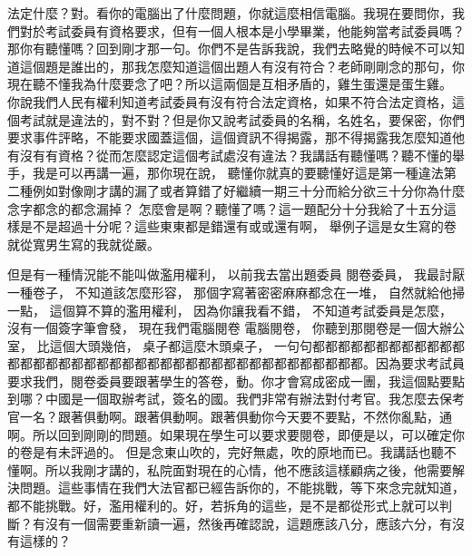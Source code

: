 \hypertarget{c08:cue:161}{}法定什麼？對。看你的電腦出了什麼問題，你就這麼相信電腦。我現在要問你，我們對於考試委員有資格要求，但有一個人根本是小學畢業，他能夠當考試委員嗎？
\hypertarget{c08:cue:162}{}那你有聽懂嗎？回到剛才那一句。你們不是告訴我說，我們去略覺的時候不可以知道這個題是誰出的，那我怎麼知道這個出題人有沒有符合？老師剛剛念的那句，你現在聽不懂我為什麼要念了吧？所以這兩個是互相矛盾的，雞生蛋還是蛋生雞。
\hypertarget{c08:cue:163}{}你說我們人民有權利知道考試委員有沒有符合法定資格，如果不符合法定資格，這個考試就是違法的，對不對？但是你又說考試委員的名稱，名姓名，要保密，你們要求事件評略，不能要求國蓋這個，這個資訊不得揭露，那不得揭露我怎麼知道他有沒有有資格？從而怎麼認定這個考試處沒有違法？我講話有聽懂嗎？聽不懂的舉手，我是可以再講一遍，那你現在說，
\hypertarget{c08:cue:164}{}聽懂你就真的要聽懂好這是第一種違法第二種例如對像剛才講的漏了或者算錯了好繼續一期三十分而給分欲三十分你為什麼念字都念的都念漏掉？
\hypertarget{c08:cue:165}{}怎麼會是啊？聽懂了嗎？這一題配分十分我給了十五分這樣是不是超過十分呢？這些東東都是錯還有或或還有啊，
\hypertarget{c08:cue:166}{}舉例子這是女生寫的卷就從寬男生寫的我就從嚴。

\hypertarget{c08:cue:167}{}但是有一種情況能不能叫做濫用權利，
\hypertarget{c08:cue:168}{}以前我去當出題委員 閱卷委員，
\hypertarget{c08:cue:169}{}我最討厭一種卷子，
\hypertarget{c08:cue:170}{}不知道該怎麼形容，
\hypertarget{c08:cue:171}{}那個字寫著密密麻麻都念在一堆，
\hypertarget{c08:cue:172}{}自然就給他掃一點，
\hypertarget{c08:cue:173}{}這個算不算的濫用權利，
\hypertarget{c08:cue:174}{}因為你讓我看不錯，
\hypertarget{c08:cue:175}{}不知道考試委員是怎麼，
\hypertarget{c08:cue:176}{}沒有一個簽字筆會發，
\hypertarget{c08:cue:177}{}現在我們電腦閱卷 電腦閱卷，
\hypertarget{c08:cue:178}{}你聽到那閱卷是一個大辦公室，
\hypertarget{c08:cue:179}{}比這個大頭幾倍，
\hypertarget{c08:cue:180}{}桌子都這麼木頭桌子，
\hypertarget{c08:cue:181}{}一句句都都都都都都都都都都都都都都都都都都都都都都都都都都都都都都都都都都都都都都都都。因為要求考試員要求我們，閱卷委員要跟著學生的答卷，動。你才會寫成密成一團，我這個點要點到哪？中國是一個取辦考試，簽名的國。我們非常有辦法對付考官。我怎麼去保考官一名？跟著俱動啊。跟著俱動啊。跟著俱動你今天要不要點，不然你亂點，通啊。所以回到剛剛的問題。如果現在學生可以要求要閱卷，即便是以，可以確定你的卷是有未評過的。
\hypertarget{c08:cue:182}{}但是念東山吹的，完好無處，吹的原地而已。我講話也聽不懂啊。所以我剛才講的，私院面對現在的心情，他不應該這樣顧病之後，他需要解決問題。這些事情在我們大法官都已經告訴你的，不能挑戰，等下來念完就知道，都不能挑戰。好，濫用權利的。好，若拆角的這些，是不是都從形式上就可以判斷？有沒有一個需要重新讀一遍，然後再確認說，這題應該八分，應該六分，有沒有這樣的？

